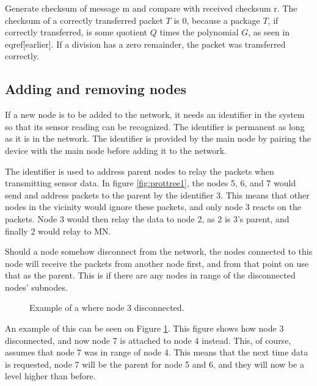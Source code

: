 Generate checksum of message m and compare with received checksum r.
The checksum of a correctly transferred packet $T$ is 0, because a package $T$, if correctly transferred, is some quotient $Q$ times the polynomial $G$, as seen in eqref[earlier]. If a division has a zero remainder, the packet was transferred correctly.




\subsection{Adding and removing nodes}
If a new node is to be added to the network, it needs an identifier in the system so that its sensor reading can be recognized. The identifier is permanent as long as it is in the network.
The identifier is provided by the main node by pairing the device with the main node before adding it to the network. 

The identifier is used to address parent nodes to relay the packets when transmitting sensor data. In figure \ref{fig:prottree1}, the nodes 5, 6, and 7 would send and address packets to the parent by the identifier 3. This means that other nodes in the vicinity would ignore these packets, and only node 3 reacts on the packets. Node 3 would then relay the data to node 2, as 2 is 3's parent, and finally 2 would relay to MN.

Should a node somehow disconnect from the network, the nodes connected to this node will receive the packets from another node first, and from that point on use that as the parent. This is if there are any nodes in range of the disconnected nodes' subnodes. 

\begin{figure}[!h]
	\centering
	\caption{Example of a where node 3 disconnected.}
	\label{fig:prottree2}
\end{figure}

An example of this can be seen on Figure \ref{fig:prottree2}. This figure shows how node 3 disconnected, and now node 7 is attached to node 4 instead. This, of course, assumes that node 7 was in range of node 4.
This means that the next time data is requested, node 7 will be the parent for node 5 and 6, and they will now be a level higher than before.
